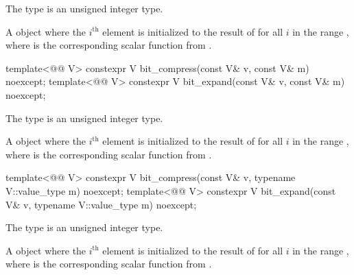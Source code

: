 \begin{itemdescr}
\pnum
\constraints
The type  is an unsigned integer type.

\pnum
\returns
A  object where the $i^\text{th}$ element is initialized to
the result of  for all $i$ in the range
, where  is the corresponding scalar
function from .
\end{itemdescr}

\begin{itemdecl}
template<@@ V>
  constexpr V bit_compress(const V& v, const V& m) noexcept;
template<@@ V>
  constexpr V bit_expand(const V& v, const V& m) noexcept;
\end{itemdecl}

\begin{itemdescr}
\pnum
\constraints
The type  is an unsigned integer type.

\pnum
\returns
A  object where the $i^\text{th}$ element is initialized to
the result of 
for all $i$ in the range ,
where  is the corresponding
scalar function from .
\end{itemdescr}

\begin{itemdecl}
template<@@ V>
  constexpr V bit_compress(const V& v, typename V::value_type m) noexcept;
template<@@ V>
  constexpr V bit_expand(const V& v, typename V::value_type m) noexcept;
\end{itemdecl}

\begin{itemdescr}
\pnum
\constraints
The type  is an unsigned integer type.

\pnum
\returns
A  object where the $i^\text{th}$ element is initialized to
the result of 
for all $i$ in the range ,
where  is the corresponding
scalar function from .
\end{itemdescr}

